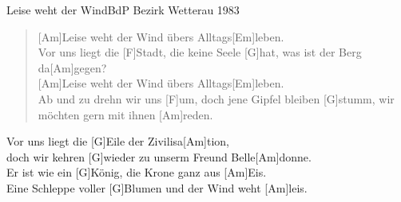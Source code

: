 \begin{song}{Leise weht der Wind}{BdP Bezirk Wetterau 1983}

    \begin{verse}  
        [Am]Leise weht der Wind übers Alltags[Em]leben. \\
        Vor uns liegt die [F]Stadt, die keine Seele [G]hat, was ist der Berg da[Am]gegen? \\

        [Am]Leise weht der Wind übers Alltags[Em]leben.\\
        Ab und zu drehn wir uns [F]um, doch jene Gipfel bleiben [G]stumm, wir möchten gern mit ihnen [Am]reden.
    \end{verse}  

    \begin{chorus}
        Vor uns liegt die [G]Eile der Zivilisa[Am]tion, \\
        doch wir kehren [G]wieder zu unserm Freund Belle[Am]donne. \\
        
        Er ist wie ein [G]König, die Krone ganz aus [Am]Eis. \\
        Eine Schleppe voller [G]Blumen und der Wind weht [Am]leis.
    \end{chorus}

\end{song}
